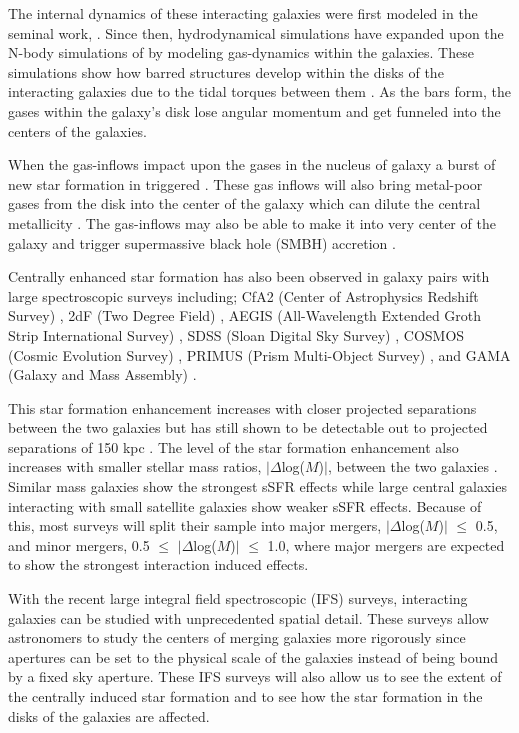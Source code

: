 \documentclass[iop,revtex4,twocolumn,apj,numberedappendix,appendixfloats]{emulateapj}
\begin{document}
The internal dynamics of these interacting galaxies were first modeled in the seminal work, \citet{Toomre:1972}. Since then, hydrodynamical simulations have expanded upon the N-body simulations of \citet{Toomre:1972} by modeling gas-dynamics within the galaxies. These simulations show how barred structures develop within the disks of the interacting galaxies due to the tidal torques between them \citep{Barnes:1991}. As the bars form, the gases within the galaxy's disk lose angular momentum and get funneled into the centers of the galaxies. 

When the gas-inflows impact upon the gases in the nucleus of galaxy a burst of new star formation in triggered \citep{Barnes:1996, Mihos:1996}. These gas inflows will also bring metal-poor gases from the disk into the center of the galaxy which can dilute the central metallicity \citep{Rupke:2010, Perez:2011, Scudder:2012}. The gas-inflows may also be able to make it into very center of the galaxy and trigger supermassive black hole (SMBH) accretion \citep{Capelo:2017}. 

Centrally enhanced star formation has also been observed in galaxy pairs with large spectroscopic surveys including; CfA2 (Center of Astrophysics Redshift Survey)  \citep{Barton:2000, Woods:2006}, 2dF (Two Degree Field) \citep{Lambas:2003}, AEGIS (All-Wavelength Extended Groth Strip International Survey) \citep{Lin:2007}, SDSS (Sloan Digital Sky Survey) \citep{Ellison:2008}, COSMOS (Cosmic Evolution Survey) \citep{Kartaltepe:2007,Xu:2012}, PRIMUS (Prism Multi-Object Survey) \citep{Wong:2011}, and GAMA (Galaxy and Mass Assembly) \citep{Robotham:2014}.

This star formation enhancement increases with closer projected separations between the two galaxies \citep{Ellison:2008, Scudder:2012} but has still shown to be detectable out to projected separations of 150 kpc \citep{Patton:2013}. The level of the star formation enhancement also increases with smaller stellar mass ratios, $|\Delta$log($M$)$|$, between the two galaxies \citep{Ellison:2008}. Similar mass galaxies show the strongest sSFR effects while large central galaxies interacting with small satellite galaxies show weaker sSFR effects. Because of this, most surveys will split their sample into major mergers, $|\Delta$log($M$)$|$ $\le$ 0.5, and minor mergers, 0.5 $\le$ $|\Delta$log($M$)$|$ $\le$ 1.0, where major mergers are expected to show the strongest interaction induced effects. 

With the recent large integral field spectroscopic (IFS) surveys, interacting galaxies can be studied with unprecedented spatial detail. These surveys allow astronomers to study the centers of merging galaxies more rigorously since apertures can be set to the physical scale of the galaxies instead of being bound by a fixed sky aperture. These IFS surveys will also allow us to see the extent of the centrally induced star formation and to see how the star formation in the disks of the galaxies are affected. 
\end{document}
